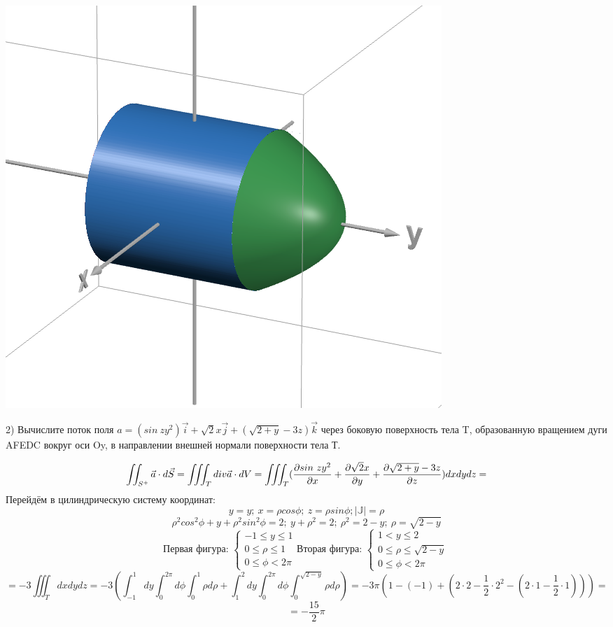\documentclass{article}
\begin{document}
\begin{center}
    \includegraphics[width=.5\textwidth]{button.png}
\end{center}
2) Вычислите поток поля $a=(sin\ zy^2)\vec{i}+ \sqrt{2}x\vec{j}+(\sqrt{2+y}-3z)\vec{k}$ через боковую
поверхность тела T, образованную вращением дуги AFEDC вокруг оси Oy, в направлении внешней нормали поверхности тела Т.

\begin{equation*}
    \iint_{S^+}\vec{a}\cdot d\vec{S}=\iiint_Tdiv\vec{a}\cdot dV =
    \iiint_T(\pdv{sin\ zy^2}{x}+\pdv{\sqrt{2}x}{y}+\pdv{\sqrt{2+y}-3z}{z})dxdydz =
\end{equation*}
Перейдём в цилиндрическую систему координат:
\begin{equation*}
    y=y;\ x=\rho cos\phi;\ z=\rho sin\phi; |\mathbb{J}|=\rho
\end{equation*}
\begin{equation*}
    \rho^2cos^2\phi+y+\rho^2sin^2\phi =2;\ y+\rho^2=2;\ \rho^2=2-y;\ \rho = \sqrt{2-y}
\end{equation*}
\begin{equation*}
    \text{Первая фигура: }
    \begin{cases}
        -1\leq y\leq 1\\
        0\leq\rho \leq 1\\
        0\leq \phi < 2\pi
    \end{cases}
    \text{Вторая фигура: }
    \begin{cases}
        1< y\leq 2\\
        0\leq\rho \leq \sqrt{2-y}\\
        0\leq \phi < 2\pi
    \end{cases}
\end{equation*}
\begin{equation*}
    =-3\iiint_Tdxdydz = -3(\int_{-1}^{1}dy\int_{0}^{2\pi}d\phi\int_{0}^{1}\rho d\rho+\int_{1}^{2}dy\int_{0}^{2\pi}d\phi\int_{0}^{\sqrt{2-y}}\rho d\rho)=-3\pi(1-(-1)+(2\cdot 2-\frac{1}{2}\cdot 2^2-(2\cdot 1-\frac{1}{2}\cdot 1)))=
\end{equation*}
\begin{equation*}
    =-\frac{15}{2}\pi
\end{equation*}
\end{document}
